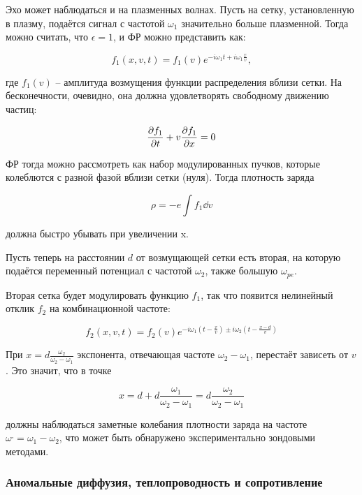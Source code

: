 \documentclass[10pt, a4paper]{article}
\begin{document}
Эхо может наблюдаться и на плазменных волнах. Пусть на сетку, установленную в плазму, подаётся сигнал с частотой $\omega_1$ значительно больше плазменной. Тогда можно считать, что $\epsilon=1$, и ФР можно представить как:

\begin{equation*}
	f_1 (x,v,t)=f_1 (v)e^{-i \omega_1 t + i \omega_1 \frac{x}{v}},
\end{equation*}

где  $f_1 (v)$ -- амплитуда возмущения функции распределения вблизи сетки. На бесконечности, очевидно, она должна удовлетворять свободному движению частиц:

\begin{equation*}
	\pdv{f_1}{t} + v \pdv{f_1}{x} =0
\end{equation*}

ФР тогда можно рассмотреть как набор модулированных пучков, которые колеблются с разной фазой вблизи сетки (нуля). Тогда плотность заряда

\begin{equation*}
	\rho = -e \int f_1 \dd{v}
\end{equation*}

должна быстро убывать при увеличении x.

Пусть теперь на расстоянии $d$ от возмущающей сетки есть вторая, на которую подаётся переменный потенциал с частотой $\omega_2$, также большую $\omega_{pe}$.

Вторая сетка будет модулировать функцию $f_1$, так что появится нелинейный отклик $f_2$ на комбинационной частоте:

\begin{equation*}
	f_2 (x,v,t)=f_2 (v) e^{-i \omega_1 (t-\frac{x}{v}) \pm i \omega_2 (t- \frac{x-d}{v})}
\end{equation*}

При $x = d\frac{\omega_2}{\omega_2-\omega_1}$ экспонента, отвечающая частоте $\omega_2-\omega_1$, перестаёт зависеть от $v$. Это значит, что в точке

\begin{equation*}
	x=d+d \frac{\omega_1}{\omega_2-\omega_1}=d  \frac{\omega_2}{\omega_2-\omega_1}
\end{equation*}

должны наблюдаться заметные колебания плотности заряда на частоте $\omega^{,} = \omega_1-\omega_2$, что может быть обнаружено экспериментально зондовыми методами.

\subsubsection{Аномальные диффузия, теплопроводность и сопротивление}
\end{document}
